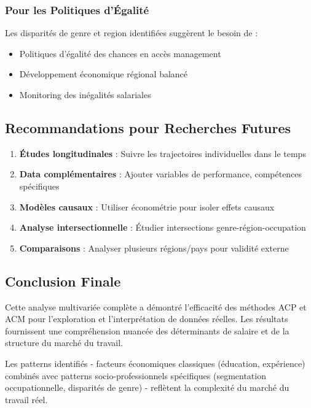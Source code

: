 \documentclass[12pt,a4paper]{report}
\begin{document}
\subsubsection{Pour les Politiques d'Égalité}

Les disparités de genre et region identifiées suggèrent le besoin de :
\begin{itemize}
    \item Politiques d'égalité des chances en accès management
    \item Développement économique régional balancé
    \item Monitoring des inégalités salariales
\end{itemize}

\subsection{Recommandations pour Recherches Futures}

\begin{enumerate}
    \item \textbf{Études longitudinales} : Suivre les trajectoires individuelles dans le temps
    
    \item \textbf{Data complémentaires} : Ajouter variables de performance, compétences spécifiques
    
    \item \textbf{Modèles causaux} : Utiliser économétrie pour isoler effets causaux
    
    \item \textbf{Analyse intersectionnelle} : Étudier intersections genre-région-occupation
    
    \item \textbf{Comparaisons} : Analyser plusieurs régions/pays pour validité externe
\end{enumerate}

\subsection{Conclusion Finale}

Cette analyse multivariée complète a démontré l'efficacité des méthodes ACP et ACM pour l'exploration et l'interprétation de données réelles. Les résultats fournissent une compréhension nuancée des déterminants de salaire et de la structure du marché du travail.

Les patterns identifiés - facteurs économiques classiques (éducation, expérience) combinés avec patterns socio-professionnels spécifiques (segmentation occupationnelle, disparités de genre) - reflètent la complexité du marché du travail réel.
\end{document}

